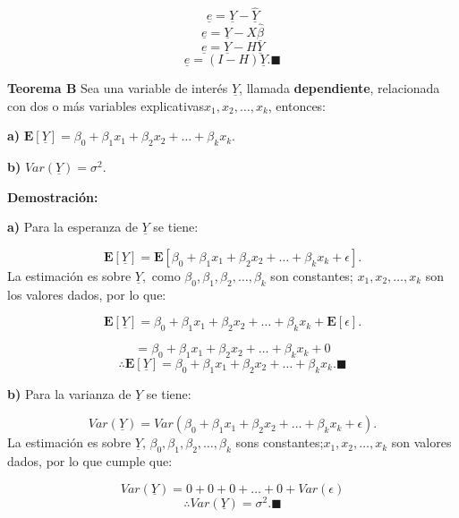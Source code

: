 \documentclass[
  a4paper,
  oneside,
  openany]{book}
\begin{document}
\[\underline{e}=\underline{Y}-\underline{\hat{Y}}\]
\[\underline{e}=\underline{Y}-X\underline{\hat{\beta}}\]
\[\underline{e}=\underline{Y}-H\underline{Y}\]
\[\underline{e}=(I-H)\underline{Y}.\blacksquare\]

\textbf{Teorema B} Sea una variable de interés \(\underline{Y}\), llamada \textbf{dependiente}, relacionada con dos o más variables explicativas\(x_{1},x_{2},\ldots,x_{k}\),
entonces:

\textbf{a)} \(\mathbf{E}[\underline{Y}]= \beta_{0}+\beta_{1}x_{1}+\beta_{2}x_{2}+ \ldots + \beta_{k}x_{k}.\)

\textbf{b)} \(Var(\underline{Y})= \sigma^2.\)

\textbf{Demostración:}

\textbf{a)} Para la esperanza de \(\underline{Y}\) se tiene:

\[\mathbf{E}[\underline{Y}]=\mathbf{E}[\beta_{0}+\beta_{1}x_{1}+\beta_{2}x_{2}+ \ldots +\beta_{k}x_{k}+\epsilon].\]
La estimación es sobre \(\underline{Y},\)
como \(\beta_{0},\beta_{1},\beta_{2},\ldots,\beta_{k}\) son constantes; \(x_{1},x_{2}, \ldots,x_{k}\) son los valores dados, por lo que:

\[\mathbf{E}[\underline{Y}]=\beta_{0}+\beta_{1}x_{1}+\beta_{2}x_{2}+ \ldots +\beta_{k}x_{k}+\mathbf{E}[\epsilon].\]

\[=\beta_{0}+\beta_{1}x_{1}+\beta_{2}x_{2}+ \ldots +\beta_{k}x_{k}+0\]
\[\therefore \mathbf{E}[\underline{Y}]= \beta_{0}+\beta_{1}x_{1}+\beta_{2}x_{2}+ \ldots + \beta_{k}x_{k}. \blacksquare\]

\textbf{b)} Para la varianza de \(\underline{Y}\) se tiene:

\[Var(\underline{Y})=Var\left( \beta_{0}+\beta_{1}x_{1}+\beta_{2}x_{2}+ \ldots + \beta_{k}x_{k}+ \epsilon\right).\]
La estimación es sobre \(\underline{Y}\), \(\beta_{0},\beta_{1},\beta_{2},\ldots,\beta_{k}\) sons constantes;\(x_{1},x_{2},\ldots,x_{k}\) son valores dados, por lo que cumple que:

\[Var(\underline{Y})=0+0+0+\ldots+0+Var(\epsilon)\]
\[\therefore Var(\underline{Y})=\sigma^2.\blacksquare\]

  
\end{document}
